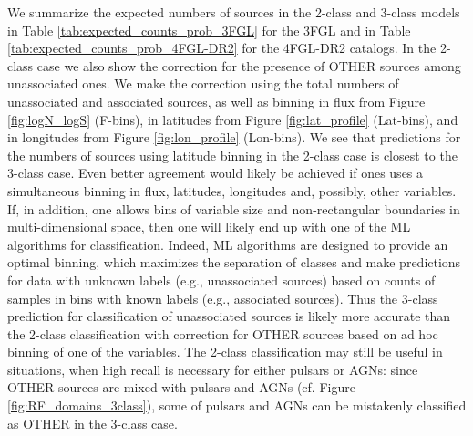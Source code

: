 We summarize the expected numbers of sources in the 2-class and 3-class models in Table \ref{tab:expected_counts_prob_3FGL} for the 3FGL and in Table \ref{tab:expected_counts_prob_4FGL-DR2} for the 4FGL-DR2 catalogs.
In the 2-class case we also show the correction for the presence of OTHER sources among unassociated ones.
We make the correction using the total numbers of unassociated and associated sources, as well as binning in flux from Figure \ref{fig:logN_logS} (F-bins), in latitudes from Figure \ref{fig:lat_profile} (Lat-bins), and in longitudes from Figure  \ref{fig:lon_profile} (Lon-bins).
We see that predictions for the numbers of sources using latitude binning in the 2-class case is closest to the 3-class case.
Even better agreement would likely be achieved if ones uses a simultaneous binning in flux, latitudes, longitudes and, possibly, other variables.
If, in addition, one allows bins of variable size and non-rectangular boundaries in multi-dimensional space, then one will likely end up with one of the ML algorithms for classification.
Indeed, ML algorithms are designed to provide an optimal binning, which maximizes the separation of classes and make predictions for data with unknown labels (e.g., unassociated sources) based on counts of samples in bins with known labels (e.g., associated sources).
Thus the 3-class prediction for classification of unassociated sources is likely more accurate than the 2-class classification with correction for OTHER sources based on ad hoc binning of one of the variables.
The 2-class classification may still be useful in situations, when high recall is necessary for either pulsars or AGNs:
since OTHER sources are mixed with pulsars and AGNs (cf. Figure \ref{fig:RF_domains_3class}), 
some of pulsars and AGNs can be mistakenly classified as OTHER in the 3-class case.




